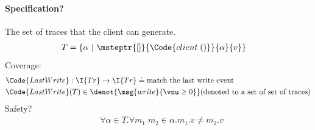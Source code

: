 \paragraph{Specification?} The set of traces that the client can generate.
\begin{align*}
    &T = \{ \alpha ~|~ \msteptr{[]}{\Code{client\;()}}{\alpha}{v} \}
\end{align*}\noindent
Coverage:
\begin{align*}
    &\Code{LastWrite}: \I{Tr} \to \I{Tr} \doteq \text{match the last write event}\\
    &\Code{LastWrite}(T) \in \denot{\msg{write}{\vnu \geq 0}} (\text{denoted to a set of set of traces}) \\
\end{align*}\noindent
Safety?
\begin{align*}
    &\forall \alpha \in T. \forall m_1\;m_2 \in \alpha. m_1.v \not= m_2.v 
\end{align*}\noindent